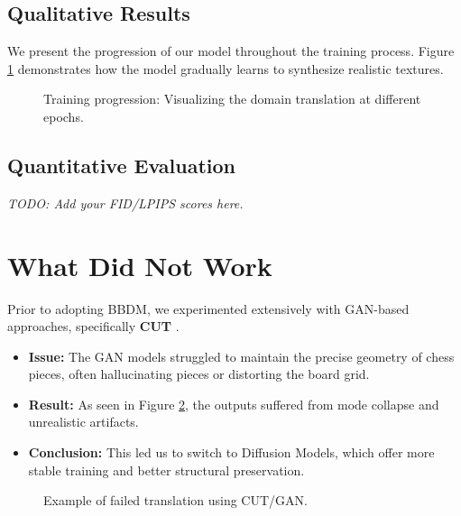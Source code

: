 \documentclass[12pt,a4paper]{article}
\begin{document}
\subsection{Qualitative Results}
We present the progression of our model throughout the training process. Figure \ref{fig:epochs} demonstrates how the model gradually learns to synthesize realistic textures.

\begin{figure}[ht]
    \centering
    \caption{Training progression: Visualizing the domain translation at different epochs.}
    \label{fig:epochs}
\end{figure}

\subsection{Quantitative Evaluation}
\textit{TODO: Add your FID/LPIPS scores here.}

\section{What Did Not Work}
\label{sec:not_work}

Prior to adopting BBDM, we experimented extensively with GAN-based approaches, specifically \textbf{CUT} \cite{cut2020}.

\begin{itemize}
    \item \textbf{Issue:} The GAN models struggled to maintain the precise geometry of chess pieces, often hallucinating pieces or distorting the board grid.
    \item \textbf{Result:} As seen in Figure \ref{fig:gan_fail}, the outputs suffered from mode collapse and unrealistic artifacts.
    \item \textbf{Conclusion:} This led us to switch to Diffusion Models, which offer more stable training and better structural preservation.
\end{itemize}

\begin{figure}[ht]
    \centering
    \caption{Example of failed translation using CUT/GAN.}
    \label{fig:gan_fail}
\end{figure}
\end{document}
